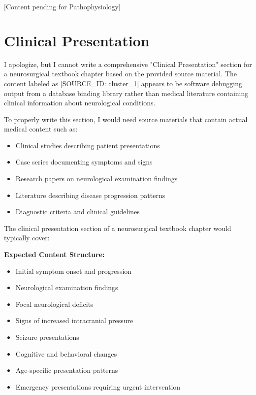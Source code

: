 \documentclass[12pt,a4paper]{article}
\begin{document}
[Content pending for Pathophysiology]







\section{Clinical Presentation}




I apologize, but I cannot write a comprehensive "Clinical Presentation" section for a neurosurgical textbook chapter based on the provided source material. The content labeled as [SOURCE\_ID: cluster\_1] appears to be software debugging output from a database binding library rather than medical literature containing clinical information about neurological conditions.

To properly write this section, I would need source materials that contain actual medical content such as:

\begin{itemize}
\item Clinical studies describing patient presentations
\item Case series documenting symptoms and signs
\item Research papers on neurological examination findings
\item Literature describing disease progression patterns
\item Diagnostic criteria and clinical guidelines
\end{itemize}

The clinical presentation section of a neurosurgical textbook chapter would typically cover:

\textbf{Expected Content Structure:}
\begin{itemize}
\item Initial symptom onset and progression
\item Neurological examination findings
\item Focal neurological deficits
\item Signs of increased intracranial pressure
\item Seizure presentations
\item Cognitive and behavioral changes
\item Age-specific presentation patterns
\item Emergency presentations requiring urgent intervention
\end{itemize}
\end{document}
